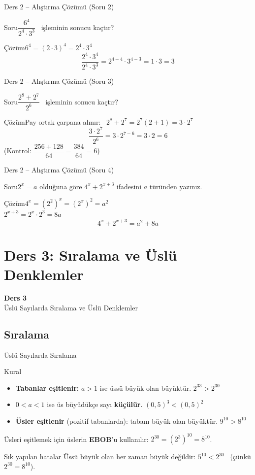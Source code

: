 \documentclass[aspectratio=169,11pt]{beamer}
\newcommand{\soru}[3]{%
\begin{frame}{#1}
  \begin{block}{Soru}\large #2\end{block}
  \pause
  \begin{exampleblock}{Çözüm}\large #3\end{exampleblock}
\end{frame}}
\begin{document}
\soru{Ders 2 -- Alıştırma Çözümü (Soru 2)}
{\(\dfrac{6^4}{2^4\cdot 3^3}\) \ işleminin sonucu kaçtır?}
{\(6^4=(2\cdot 3)^4=2^4\cdot 3^4\)
\[\frac{2^4\cdot 3^4}{2^4\cdot 3^3}=2^{4-4}\cdot 3^{4-3}=1\cdot 3=3\]}

\soru{Ders 2 -- Alıştırma Çözümü (Soru 3)}
{\(\dfrac{2^8+2^7}{2^6}\) \ işleminin sonucu kaçtır?}
{Pay ortak çarpana alınır: \ \(2^8+2^7=2^7(2+1)=3\cdot 2^7\)
\[\frac{3\cdot 2^7}{2^6}=3\cdot 2^{7-6}=3\cdot 2=6\]
(Kontrol: \(\dfrac{256+128}{64}=\dfrac{384}{64}=6\))}

\soru{Ders 2 -- Alıştırma Çözümü (Soru 4)}
{\(2^x=a\) olduğuna göre \(4^x+2^{x+3}\) ifadesini \(a\) türünden yazınız.}
{\(4^x=(2^2)^x=(2^x)^2=a^2\)\\[4pt]
\(2^{x+3}=2^x\cdot 2^3=8a\)
\[4^x+2^{x+3}=a^2+8a\]}


\section{Ders 3: Sıralama ve Üslü Denklemler}
\begin{frame}
\centering\Large\color{anamavi}\textbf{Ders 3}\\[6pt]\normalsize Üslü Sayılarda Sıralama ve Üslü Denklemler
\end{frame}

\subsection{Sıralama}
\begin{frame}{Üslü Sayılarda Sıralama}
\begin{block}{Kural}
\begin{itemize}
\item \textbf{Tabanlar eşitlenir:} \(a>1\) ise üssü büyük olan büyüktür. \quad \(2^{33}>2^{30}\)
\item \(0<a<1\) ise üs büyüdükçe sayı \textbf{küçülür}. \quad \((0{,}5)^3<(0{,}5)^2\)
\item \textbf{Üsler eşitlenir} (pozitif tabanlarda): tabanı büyük olan büyüktür. \quad \(9^{10}>8^{10}\)
\end{itemize}
Üsleri eşitlemek için üslerin \textbf{EBOB}'u kullanılır: \(2^{30}=(2^3)^{10}=8^{10}\).
\end{block}
\begin{alertblock}{Sık yapılan hatalar}
Üssü büyük olan her zaman büyük değildir: \(5^{10}<2^{30}\) \ (çünkü \(2^{30}=8^{10}\)).
\end{alertblock}
\end{frame}
\end{document}
